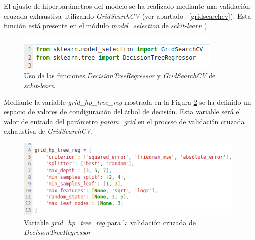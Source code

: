 \documentclass[12pt,a4paper,Spanish]{article}
\begin{document}
El ajuste de hiperparámetros del modelo se ha realizado mediante una validación cruzada exhaustiva utilizando \textit{GridSearchCV} (ver apartado ~\ref{gridsearchcv}). Esta función está presente en el módulo \textit{model\_selection} de \textit{sckit-learn} \cite{scikit-learn}).
\begin{figure}[H]
	\centering
	\includegraphics[width=0.7\linewidth]{figs/import_tree}
	\caption{Uso de las funciones \textit{DecisionTreeRegressor} y \textit{GridSearchCV} de \textit{sckit-learn}}
	\label{fig:importtree}
\end{figure}

Mediante la variable \textit{grid\_hp\_tree\_reg} mostrada en la Figura \ref{fig:paramstree} se ha definido un espacio de valores de condiguración del árbol de decisión. Esta variable será el valor de entrada del parámetro \textit{param\_grid} en el proceso de validación cruzada exhaustiva de \textit{GridSearchCV}.
\begin{figure}[H]
	\centering
	\includegraphics[width=0.7\linewidth]{figs/params_tree}
	\caption{Variable \textit{grid\_hp\_tree\_reg} para la validación cruzada de \textit{DecisionTreeRegressor}}
	\label{fig:paramstree}
\end{figure}
\end{document}
